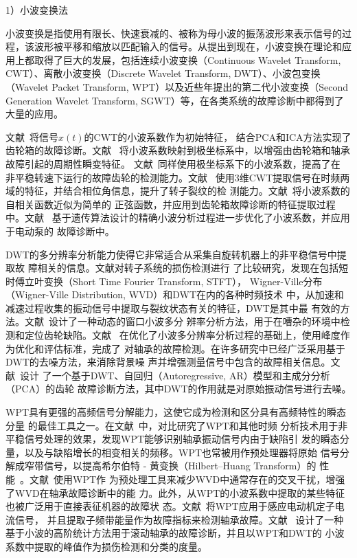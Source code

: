1）小波变换法

小波变换是指使用有限长、快速衰减的、被称为母小波的振荡波形来表示信号的过
程，该波形被平移和缩放以匹配输入的信号。从提出到现在，小波变换在理论和应
用上都取得了巨大的发展，包括连续小波变换（Continuous Wavelet Transform,
CWT）、离散小波变换（Discrete Wavelet Transform, DWT）、小波包变换（Wavelet
Packet Transform, WPT）以及近些年提出的第二代小波变换（Second Generation
Wavelet Transform, SGWT）等，在各类系统的故障诊断中都得到了大量的应用。

文献~将信号$x(t)$的CWT的小波系数作为初始特征，
结合PCA和ICA方法实现了齿轮箱的故障诊断。文献~
将小波系数映射到极坐标系中，以增强由齿轮箱和轴承故障引起的周期性瞬变特征。
文献~同样使用极坐标系下的小波系数，提高了在
非平稳转速下运行的故障齿轮的检测能力。文献~
使用3维CWT提取信号在时频两域的特征，并结合相位角信息，提升了转子裂纹的检
测能力。文献~将小波系数的自相关函数近似为简单的
正弦函数，并应用到齿轮箱故障诊断的特征提取过程中。文献~
基于遗传算法设计的精确小波分析过程进一步优化了小波系数，并应用于电动泵的
故障诊断中。

DWT的多分辨率分析能力使得它非常适合从采集自旋转机器上的非平稳信号中提取故
障相关的信息。文献对转子系统的损伤检测进行
了比较研究，发现在包括短时傅立叶变换（Short Time Fourier Transform, STFT），
Wigner-Ville分布（Wigner-Ville Distribution, WVD）和DWT在内的各种时频技术
中，从加速和减速过程收集的振动信号中提取与裂纹状态有关的特征，DWT是其中最
有效的方法。文献~设计了一种动态的窗口小波多分
辨率分析方法，用于在嘈杂的环境中检测和定位齿轮缺陷。文献~
在优化了小波多分辨率分析过程的基础上，使用峰度作为优化和评估标准，完成了
对轴承的故障检测。在许多研究中已经广泛采用基于DWT的去噪方法，来消除背景噪
声并增强测量信号中包含的故障相关信息。文献~设计
了一个基于DWT、自回归（Autoregressive, AR）模型和主成分分析（PCA）的齿轮
故障诊断方法，其中DWT的作用就是对原始振动信号进行去噪。

WPT具有更强的高频信号分解能力，这使它成为检测和区分具有高频特性的瞬态分量
的最佳工具之一。在文献~中，对比研究了WPT和其他时频
分析技术用于非平稳信号处理的效果，发现WPT能够识别轴承振动信号内由于缺陷引
发的瞬态分量，以及与缺陷增长的相变相关的频移。WPT也常被用作预处理器将原始
信号分解成窄带信号，以提高希尔伯特 - 黄变换（Hilbert–Huang Transform）的
性能~\cite{peng2005comparison}。文献~使用WPT作
为预处理工具来减少WVD中通常存在的交叉干扰，增强了WVD在轴承故障诊断中的能
力。此外，从WPT的小波系数中提取的某些特征也被广泛用于直接表征机器的故障状
态。文献~将WPT应用于感应电动机定子电流信号，
并且提取子频带能量作为故障指标来检测轴承故障。文献~
设计了一种基于小波的高阶统计方法用于滚动轴承的故障诊断，并且以WPT和DWT的
小波系数中提取的峰值作为损伤检测和分类的度量。

